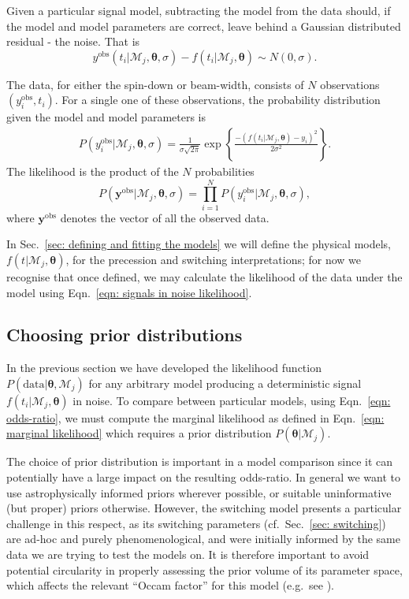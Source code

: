 \documentclass[../full_thesis/full_thesis.tex]{subfiles}
\newcommand{\M}{\mathcal{M}}
\newcommand{\data}{\textrm{data}}
\newcommand{\params}{\boldsymbol{\theta}}
\newcommand{\yobs}{y^{\textrm{obs}}}
\newcommand{\ydata}{\mathbf{y}^{\mathrm{obs}}}
\begin{document}
Given a particular signal model, subtracting the model from the data
should, if the model and model parameters are correct, leave behind a Gaussian
distributed residual - the noise. That is
\begin{equation}
\yobs(t_i| \M_{j}, \params, \sigma) - f(t_i|\M_{j}, \params) \sim N(0, \sigma).
\end{equation}

The data, for either the spin-down or beam-width, consists of $N$ observations
$(\yobs_{i}, t_{i})$. For a
single one of these observations,
the probability distribution given the model and model parameters is
\begin{align}
P(y_{i}^{\textrm{obs}}| \M_j, \params, \sigma) =
\frac{1}{\sigma\sqrt{2\pi}}
\exp\left\{\frac{-\left(f(t_{i}|\M_j, \params)
            - y_{i}\right)^{2}}{2\sigma^{2}}\right\}.
\end{align}
The likelihood is the product of the $N$ probabilities
\begin{equation}
P(\ydata| \M_{j}, \params, \sigma) =
              \prod_{i=1}^{N} P(y_{i}^{\textrm{obs}}|\M_{j}, \params, \sigma),
\label{eqn: signals in noise likelihood}
\end{equation}
where $\ydata$ denotes the vector of all the observed data.

In Sec.~\ref{sec: defining and fitting the models} we will define the physical
models, $f(t| \M_j, \params)$, for the precession and
switching interpretations; for now we recognise that once defined, we may
calculate the likelihood of the data under the model using Eqn.~\eqref{eqn:
signals in noise likelihood}.

\subsection{Choosing prior distributions}
\label{sec: setting prior distributions}

In the previous section we have developed the likelihood function $P(\data|
\params, \M_{j})$ for any arbitrary model producing a deterministic signal
$f(t_{i}|\M_j, \params)$ in noise. To compare between particular models, using
Eqn.~\eqref{eqn: odds-ratio}, we must compute the marginal likelihood as
defined in Eqn.~\eqref{eqn: marginal likelihood} which requires a prior
distribution $P(\params|\M_{j})$.

The choice of prior distribution is important in a model comparison since it
can potentially have a large impact on the resulting odds-ratio.  In general we
want to use astrophysically informed priors wherever possible, or suitable
uninformative (but proper) priors otherwise. However, the switching model
presents a particular challenge in this respect, as its switching parameters
(cf.\ Sec.~\ref{sec: switching}) are ad-hoc and purely phenomenological, and
were initially informed by the same data we are trying to test the models on.
It is therefore important to avoid potential circularity in properly assessing
the prior volume of its parameter space, which affects the relevant ``Occam
factor'' for this model (e.g.\ see \citet{mackay2003information}).
\end{document}
